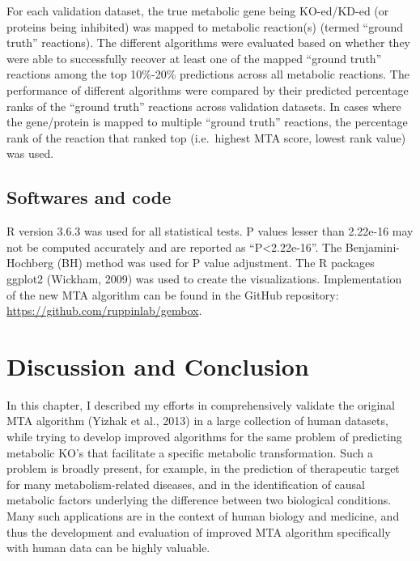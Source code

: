 \documentclass[12pt,twoside,openany,\mydriver]{thesis}  %
\begin{document}
For each validation dataset, the true metabolic gene being KO-ed/KD-ed (or proteins being inhibited) was mapped to metabolic reaction(s) (termed ``ground truth'' reactions). The different algorithms were evaluated based on whether they were able to successfully recover at least one of the mapped ``ground truth'' reactions among the top 10\%-20\% predictions across all metabolic reactions. The performance of different algorithms were compared by their predicted percentage ranks of the ``ground truth'' reactions across validation datasets. In cases where the gene/protein is mapped to multiple ``ground truth'' reactions, the percentage rank of the reaction that ranked top (i.e.~highest MTA score, lowest rank value) was used.

\hypertarget{softwares-and-code}{%
\subsection{Softwares and code}\label{softwares-and-code}}

R version 3.6.3 was used for all statistical tests. P values lesser than 2.22e-16 may not be computed accurately and are reported as ``P\textless{}2.22e-16''. The Benjamini-Hochberg (BH) method was used for P value adjustment. The R packages ggplot2 (Wickham, 2009) was used to create the visualizations. Implementation of the new MTA algorithm can be found in the GitHub repository: \url{https://github.com/ruppinlab/gembox}.

\hypertarget{discussion-and-conclusion}{%
\section{Discussion and Conclusion}\label{discussion-and-conclusion}}

In this chapter, I described my efforts in comprehensively validate the original MTA algorithm (Yizhak et al., 2013) in a large collection of human datasets, while trying to develop improved algorithms for the same problem of predicting metabolic KO's that facilitate a specific metabolic transformation. Such a problem is broadly present, for example, in the prediction of therapeutic target for many metabolism-related diseases, and in the identification of causal metabolic factors underlying the difference between two biological conditions. Many such applications are in the context of human biology and medicine, and thus the development and evaluation of improved MTA algorithm specifically with human data can be highly valuable.
\end{document}
